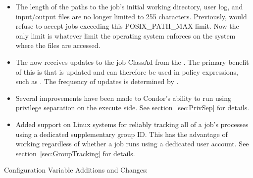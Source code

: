 \begin{itemize}
\item The length of the paths to the job's initial working directory,
user log, and input/output files are no longer limited to 255
characters.  Previously,  would refuse to accept jobs
exceeding this POSIX\_PATH\_MAX limit.  Now the only limit is whatever
limit the operating system enforces on the system where the files are accessed.

\item The  now receives updates to the job ClassAd from
the .  The primary benefit of this is that
 is updated and can therefore be used in policy
expressions, such as .  The frequency of updates is
determined by .

\item Several improvements have been made to Condor's ability to run
using privilege separation on the execute side. See section~\ref{sec:PrivSep}
for details.

\item Added support on Linux systems for reliably tracking all of a job's
processes using a dedicated supplementary group ID. This has the advantage
of working regardless of whether a job runs using a dedicated user account.
See section~\ref{sec:GroupTracking} for details.

\end{itemize}

\noindent Configuration Variable Additions and Changes:

